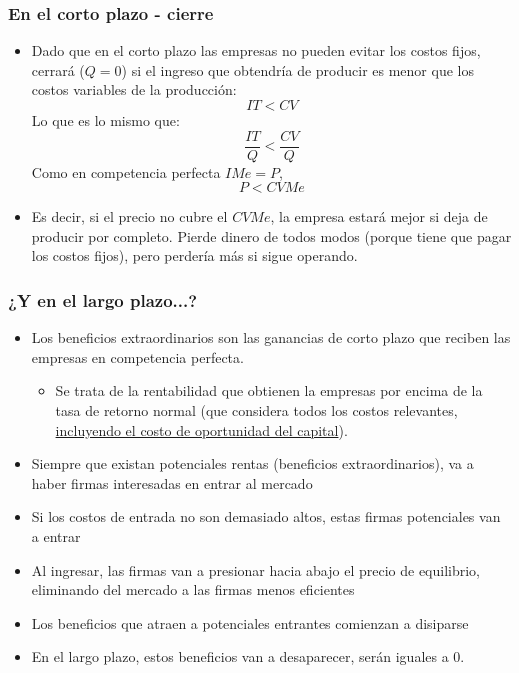 \documentclass{beamer}
\begin{document}
\begin{frame}
    \frametitle{En el corto plazo -  cierre}
\begin{itemize}
    \item  Dado que en el corto plazo las empresas no pueden evitar los costos fijos, cerrará ($Q=0$) si el ingreso que obtendría de producir es menor que los costos variables de la producción: 
            \[ IT< CV \]
Lo que es lo mismo que:
\[ \frac{IT}{Q} < \frac{CV}{Q} \]
Como en competencia perfecta $IMe=P$, 
\[ P < CVMe \]
\item Es decir, si el precio no cubre el $CVMe$, la empresa estará mejor si deja de producir por completo. Pierde dinero de todos modos (porque tiene que pagar los costos fijos), pero perdería más si sigue operando.
\end{itemize}
\end{frame}

\begin{frame}
\frametitle{¿Y en el largo plazo...?}
\begin{itemize}
\item Los beneficios extraordinarios son las ganancias de corto plazo que reciben las empresas en competencia perfecta.
    \begin{itemize}
    \item Se trata de la rentabilidad que obtienen la empresas por encima de la tasa de retorno normal (que considera todos los costos relevantes, \underline{incluyendo el costo de oportunidad del capital}).
    \end{itemize}
    \item Siempre que existan potenciales rentas (beneficios extraordinarios), va a haber firmas interesadas en entrar al mercado
    \item Si los costos de entrada no son demasiado altos, estas firmas potenciales van a entrar
    \item Al ingresar, las firmas van a presionar hacia abajo el precio de equilibrio, eliminando del mercado a las firmas menos eficientes
    \item Los beneficios que atraen a potenciales entrantes comienzan a disiparse
    \item En el largo plazo, estos beneficios van a desaparecer, serán iguales a 0.
    \end{itemize}
\end{frame}
\end{document}
